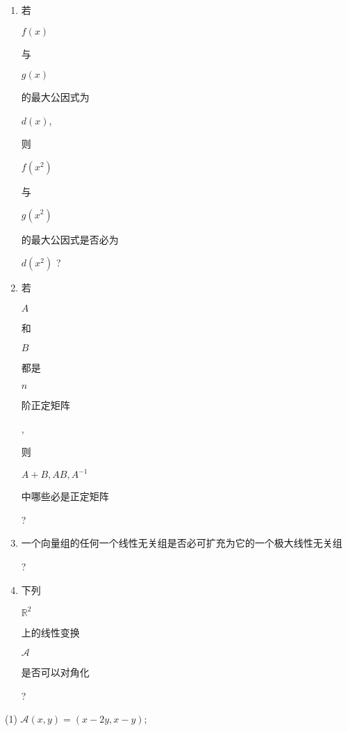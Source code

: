 \documentclass[10pt]{article}
\begin{document}
\begin{enumerate}
  \item \begin{CJK}{UTF8}{mj}若\end{CJK} $f(x)$ \begin{CJK}{UTF8}{mj}与\end{CJK} $g(x)$ \begin{CJK}{UTF8}{mj}的最大公因式为\end{CJK} $d(x)$, \begin{CJK}{UTF8}{mj}则\end{CJK} $f\left(x^{2}\right)$ \begin{CJK}{UTF8}{mj}与\end{CJK} $g\left(x^{2}\right)$ \begin{CJK}{UTF8}{mj}的最大公因式是否必为\end{CJK} $d\left(x^{2}\right)$ ?

  \item \begin{CJK}{UTF8}{mj}若\end{CJK} $A$ \begin{CJK}{UTF8}{mj}和\end{CJK} $B$ \begin{CJK}{UTF8}{mj}都是\end{CJK} $n$ \begin{CJK}{UTF8}{mj}阶正定矩阵\end{CJK}, \begin{CJK}{UTF8}{mj}则\end{CJK} $A+B, A B, A^{-1}$ \begin{CJK}{UTF8}{mj}中哪些必是正定矩阵\end{CJK}?

  \item \begin{CJK}{UTF8}{mj}一个向量组的任何一个线性无关组是否必可扩充为它的一个极大线性无关组\end{CJK}?

  \item \begin{CJK}{UTF8}{mj}下列\end{CJK} $\mathbb{R}^{2}$ \begin{CJK}{UTF8}{mj}上的线性变换\end{CJK} $\mathscr{A}$ \begin{CJK}{UTF8}{mj}是否可以对角化\end{CJK}?

\end{enumerate}
(1) $\mathscr{A}(x, y)=(x-2 y, x-y)$;
\end{document}
